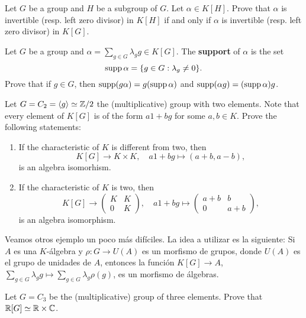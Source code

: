 \begin{exercise}
	Let $G$ be a group and $H$ be a subgroup of $G$. Let $\alpha\in K[H]$. Prove that 
    $\alpha$ is invertible (resp. left zero divisor) in $K[H]$ if and only if 
	$\alpha$ is invertible (resp. left zero divisor) in
	$K[G]$.
\end{exercise}

\begin{exercise}
	Let $G$ be a group and $\alpha=\sum_{g\in G}\lambda_gg\in K[G]$.  
	The \textbf{support} of $\alpha$ is the set 
	\[
		\operatorname{supp}\alpha=\{g\in G:\lambda_g\ne 0\}.
	\]
	Prove that if $g\in G$, then 
	$\operatorname{supp}(g\alpha)=g(\operatorname{supp}\alpha)$ and $\operatorname{supp}(\alpha g)=(\operatorname{supp}\alpha)g$.
\end{exercise}


\begin{exercise}
	Let $G=C_2=\langle g\rangle\simeq\mathbb{Z}/2$ the (multiplicative) 
	group with two elements. Note that every element of $K[G]$ is of the form
	$a1+bg$ for some $a,b\in K$. Prove the following statements:
	\begin{enumerate}
	    \item If the characteristic of $K$ is different from two, then 
	    \[
		K[G]\to K\times K,
		\quad
		a1+bg\mapsto (a+b,a-b),
	\]
	is an algebra isomorhism. 
	\item If the characteristic of $K$ is two, then 
	\[
	K[G]\to \begin{pmatrix}
			K & K\\
			0 & K
		\end{pmatrix},
		\quad
		a1+bg\mapsto\begin{pmatrix}
			a+b & b\\
			0 & a+b
		\end{pmatrix},
	\]
	is an algebra isomorphism. 
	\end{enumerate}
\end{exercise}

Veamos otros ejemplo un poco más difíciles. La idea a utilizar es la siguiente:
Si $A$ es una $K$-álgebra y $\rho\colon G\to U(A)$ es un morfismo de grupos,
donde $U(A)$ es el grupo de unidades de $A$, entonces la función $K[G]\to A$,
$\sum_{g\in G}\lambda_gg\mapsto\sum_{g\in G}\lambda_g\rho(g)$, es un morfismo
de álgebras.

\begin{exercise}
	Let $G=C_3$ be the (multiplicative) group of three elements. Prove that
	$\mathbb{R}[G]\simeq\mathbb{R}\times\mathbb{C}$.
\end{exercise}

